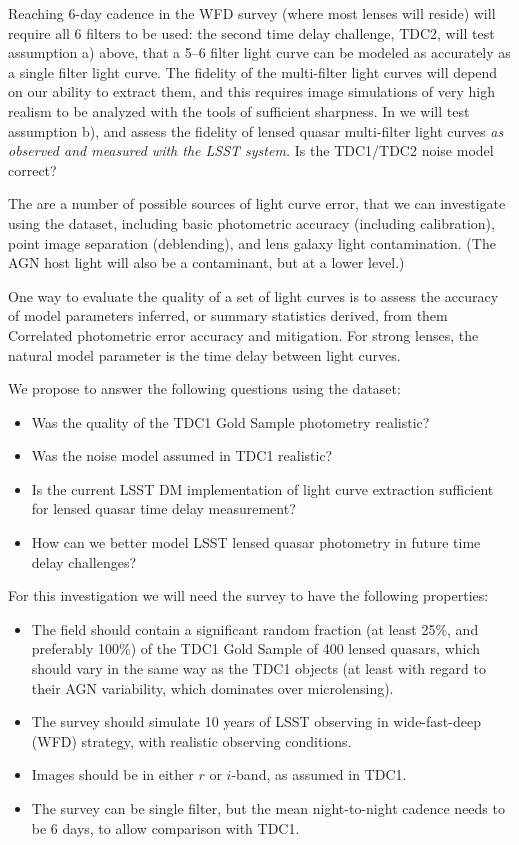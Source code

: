 Reaching 6-day cadence  in the WFD survey (where most lenses will
reside) will require all 6 filters to be used: the second time delay
challenge, TDC2, will test assumption a) above, that  a 5--6 filter
light curve can be modeled as accurately as a single filter light
curve. The fidelity of the multi-filter light curves will depend on
our ability to extract them, and this requires image simulations of
very high realism to be analyzed with the tools of sufficient
sharpness. In \TwinklesOne we will test assumption b), and assess the
fidelity of lensed quasar multi-filter light curves {\it as observed and
measured with the LSST system.} Is the TDC1/TDC2 noise model correct?

The are a number of possible sources of light curve error, that we can
investigate using the \TwinklesOne dataset, including basic photometric
accuracy (including calibration), point image separation (deblending), and
lens galaxy light contamination. (The AGN host light will also be a contaminant,
but at a lower level.)

One way to evaluate the quality of a set of light curves is to assess the accuracy of
model parameters inferred, or summary statistics derived, from them
Correlated photometric error accuracy and mitigation. For strong lenses,
the natural model parameter is the time delay between light curves.

We propose to answer the following questions using the \TwinklesOne dataset:
\begin{itemize}
\item Was the quality of the TDC1 Gold Sample photometry realistic?
\item Was the noise model assumed in TDC1 realistic?
\item Is the current LSST DM implementation of light curve extraction
      sufficient for lensed quasar time delay measurement?
\item How can we better model LSST lensed quasar photometry in
      future time delay challenges?
\end{itemize}

For this investigation we will need the \TwinklesOne survey to have the following
properties:
\begin{itemize}
\item The field should contain a significant random fraction (at least
25\%,  and preferably 100\%) of the TDC1 Gold Sample of 400 lensed
quasars,  which should vary in the same way as the TDC1 objects (at
least with regard to their  AGN variability, which dominates over
microlensing).
\item The survey should simulate 10 years of LSST observing in
wide-fast-deep (WFD) strategy, with realistic observing conditions.
\item Images should be in either $r$ or $i$-band, as assumed in TDC1.
\item The survey can be single filter, but the mean night-to-night
cadence needs to be 6 days, to allow comparison with TDC1.
\end{itemize}

